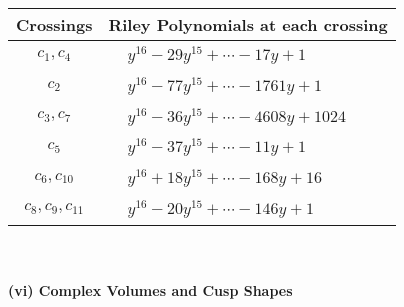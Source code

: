 \documentclass[1p]{elsarticle_modified}
\theoremstyle{definition}
\begin{document}
\begin{tabular}{m{50pt}|m{274pt}}
Crossings & \hspace{64pt}Riley Polynomials at each crossing \\
\hline $$\begin{aligned}c_{1},c_{4}\end{aligned}$$&$\begin{aligned}
&y^{16}-29 y^{15}+\cdots-17 y+1
\end{aligned}$\\
\hline $$\begin{aligned}c_{2}\end{aligned}$$&$\begin{aligned}
&y^{16}-77 y^{15}+\cdots-1761 y+1
\end{aligned}$\\
\hline $$\begin{aligned}c_{3},c_{7}\end{aligned}$$&$\begin{aligned}
&y^{16}-36 y^{15}+\cdots-4608 y+1024
\end{aligned}$\\
\hline $$\begin{aligned}c_{5}\end{aligned}$$&$\begin{aligned}
&y^{16}-37 y^{15}+\cdots-11 y+1
\end{aligned}$\\
\hline $$\begin{aligned}c_{6},c_{10}\end{aligned}$$&$\begin{aligned}
&y^{16}+18 y^{15}+\cdots-168 y+16
\end{aligned}$\\
\hline $$\begin{aligned}c_{8},c_{9},c_{11}\end{aligned}$$&$\begin{aligned}
&y^{16}-20 y^{15}+\cdots-146 y+1
\end{aligned}$\\
\hline
\end{tabular}\\~\\
\newpage\flushleft \textbf{(vi) Complex Volumes and Cusp Shapes}
\end{document}
